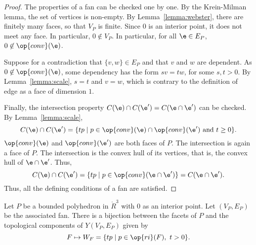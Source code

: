 \begin{proof} The properties of a fan can be checked one by one.
By the Krein-Milman lemma, the set of vertices is non-empty.  By Lemma~\ref{lemma:webster}, there are finitely many faces, so that $V_P$ is finite.  Since $0$ is an interior point, it does not meet any face.  In particular, $0\not\in V_P$.   In particular,
for all $\e\in E_P$, 
$0\not\in \op{conv}(\e)$.

Suppose for a contradiction that $\{v,w\}\in E_P$ and that $v$ and $w$ are dependent.  As $0\not\in \op{conv}(\e)$, some dependency has the form $s v = t w$, for some $s, t>0$.  By Lemma~\ref{lemma:scale}, $s=t$ and $v=w$, which is contrary to the definition of edge as a face of dimension $1$.

Finally, the intersection property $C(\e)\cap C(\e') = C(\e \cap \e')$ can be checked.
By Lemma~\ref{lemma:scale},
$$
C(\e) \cap C(\e') = \{t p \mid p\in \op{conv}(\e) \cap \op{conv}(\e') \text{ and } t \ge 0\}.
$$
$\op{conv}(\e)$ and $\op{conv}(\e')$ are both faces of $P$.  The intersection is again a face of $P$.  The intersection is the convex hull of its vertices, that is, the convex hull of $\e \cap \e'$.  Thus,
$$
C(\e)\cap C(\e') = \{t p \mid p\in \op{conv}(\e\cap \e')\} = C(\e \cap \e').
$$
Thus, all the defining conditions of a fan are satisfied.
\end{proof}


\begin{lemma}\label{lemma:WF} 
Let $P$ be a bounded polyhedron in $\ring{R}^3$ with $0$ as an interior point.  Let $(V_P,E_P)$ be the associated fan.  There is a bijection between the facets of $P$ and the topological components of $Y(V_P,E_P)$ given by 
$$
F \mapsto W_F = \{t p \mid p\in \op{ri}(F),~t >0\}.
$$
\end{lemma}
%

